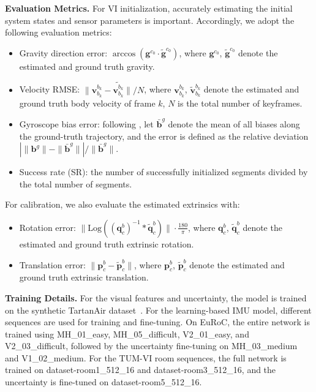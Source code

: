 \noindent\textbf{Evaluation Metrics.}
For VI initialization, accurately estimating the initial system states and sensor parameters is important. Accordingly, we adopt the following evaluation metrics:
\begin{itemize}
\item Gravity direction error: $\arccos(\mathbf{g}^{c_0} \cdot \tilde{\mathbf{g}}^{c_0})$, where $\mathbf{g}^{c_0}$, $\tilde{\mathbf{g}}^{c_0}$ denote the estimated and ground truth gravity.
\item Velocity RMSE: $\|\mathbf{v}^{b_k}_{b_k}-\tilde{\mathbf{v}^{b_k}_{b_k}}\| / N$, where $\mathbf{v}^{b_k}_{b_k}$, $\tilde{\mathbf{v}}^{b_k}_{b_k}$ denote the estimated and ground truth body velocity of frame $k$, $N$ is the total number of keyframes.
\item Gyroscope bias error: following \cite{he2023rotation, mu2025robust}, let $\bar{\mathbf{b}}^g$ denote the mean of all biases along the ground-truth trajectory, and the error is defined as the relative deviation $\left| \|\mathbf{b}^g\| - \|\bar{\mathbf{b}}^g\| \right| / \|\bar{\mathbf{b}}^g\|$.
\item Success rate (SR): the number of successfully initialized segments divided by the total number of segments.
\end{itemize}
For calibration, we also evaluate the estimated extrinsics with:
\begin{itemize}
\item Rotation error: $\|\text{Log}((\mathbf{q}^b_c)^{-1} * \tilde{\mathbf{q}}^b_c)\| \cdot \frac{180}{\pi}$, where $\mathbf{q}^b_c$, $\tilde{\mathbf{q}}^b_c$ denote the estimated and ground truth extrinsic rotation.
\item Translation error: $\|\mathbf{p}^b_c - \tilde{\mathbf{p}}^b_c\|$, where $\mathbf{p}^b_c$, $\tilde{\mathbf{p}}^b_c$ denote the estimated and ground truth extrinsic translation.
\end{itemize}


\noindent\textbf{Training Details.}
For the visual features and uncertainty, the model is trained on the synthetic TartanAir dataset~\cite{wang2020tartanair}. For the learning-based IMU model, different sequences are used for training and fine-tuning. On EuRoC, the entire network is trained using MH\_01\_easy, MH\_05\_difficult, V2\_01\_easy, and V2\_03\_difficult, followed by the uncertainty fine-tuning on MH\_03\_medium and V1\_02\_medium. For the TUM-VI room sequences, the full network is trained on dataset-room1\_512\_16 and dataset-room3\_512\_16, and the uncertainty is fine-tuned on dataset-room5\_512\_16.



